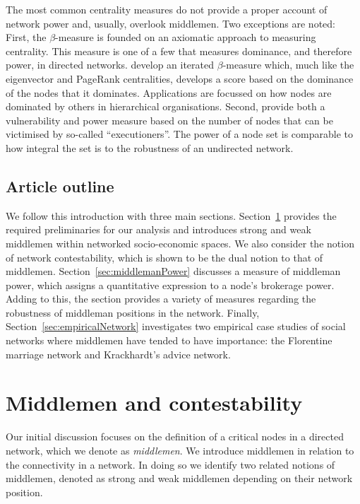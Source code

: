 \documentclass[11pt,fleqn]{article}
\begin{document}
The most common centrality measures do not provide a proper account of network power and, usually, overlook middlemen. Two exceptions are noted: First, the $\beta$-measure \citep{BrinkGilles1996, BrinkGilles2000} is founded on an axiomatic approach to measuring centrality. This measure is one of a few that measures dominance, and therefore power, in directed networks. \citet{BormBrink2002} develop an iterated $\beta$-measure which, much like the eigenvector and PageRank centralities, develops a score based on the dominance of the nodes that it dominates. Applications are focussed on how nodes are dominated by others in hierarchical organisations. Second, \citet{Bozzo2015} provide both a vulnerability and power measure based on the number of nodes that can be victimised by so-called ``executioners''. The power of a node set is comparable to how integral the set is to the robustness of an undirected network.

\subsection{Article outline}

We follow this introduction with three main sections. Section~\ref{sec:middlemenContestability} provides the required preliminaries for our analysis and introduces strong and weak middlemen within networked socio-economic spaces. We also consider the notion of network contestability, which is shown to be the dual notion to that of middlemen. Section~\ref{sec:middlemanPower} discusses a measure of middleman power, which assigns a quantitative expression to a node's brokerage power. Adding to this, the section provides a variety of measures regarding the robustness of middleman positions in the network. Finally, Section~\ref{sec:empiricalNetwork} investigates two empirical case studies of social networks where middlemen have tended to have importance: the Florentine marriage network and Krackhardt's advice network.

\section{Middlemen and contestability}
\label{sec:middlemenContestability}

Our initial discussion focuses on the definition of a critical nodes in a directed network, which we denote as \emph{middlemen}. We introduce middlemen in relation to the connectivity in a network. In doing so we identify two related notions of middlemen, denoted as strong and weak middlemen depending on their network position.
\end{document}
